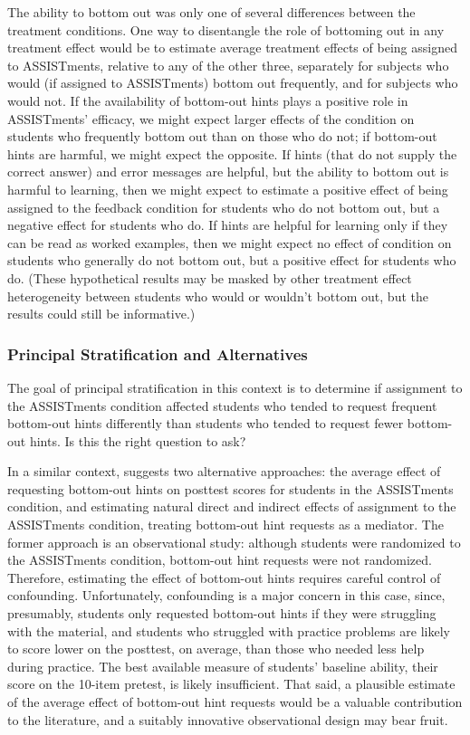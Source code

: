 \documentclass[]{article}
\begin{document}
The ability to bottom out was only one of several differences between the treatment conditions. One way to disentangle the role of bottoming out in any treatment effect would be to estimate average treatment effects of being assigned to ASSISTments, relative to any of the other three, separately for subjects who would (if assigned to ASSISTments) bottom out frequently, and for subjects who would not.
If the availability of bottom-out hints plays a positive role in ASSISTments' efficacy, we might expect larger effects of the condition on students who frequently bottom out than on those who do not; if bottom-out hints are harmful, we might expect the opposite.
If hints (that do not supply the correct answer) and error messages are helpful, but the ability to bottom out is harmful to learning, then we might expect to estimate a positive effect of being assigned to the feedback condition for students who do not bottom out, but a negative effect for students who do. If hints are helpful for learning only if they can be read as worked examples, then we might expect no effect of condition on students who generally do not bottom out, but a positive effect for students who do.
(These hypothetical results may be masked by other treatment effect heterogeneity between students who would or wouldn't bottom out, but the results could still be informative.)

\subsubsection{Principal Stratification and Alternatives}\label{sec:psInEdTech}
The goal of principal stratification in this context is to determine if assignment to the ASSISTments condition affected students who tended to request frequent bottom-out hints differently than students who tended to request fewer bottom-out hints.
Is this the right question to ask?

In a similar context, \citet{sales2021student} suggests two alternative approaches: the average effect of requesting bottom-out hints on posttest scores for students in the ASSISTments condition, and estimating natural direct and indirect effects of assignment to the ASSISTments condition, treating bottom-out hint requests as a mediator.
The former approach is an observational study: although students were randomized to the ASSISTments condition, bottom-out hint requests were not randomized. Therefore, estimating the effect of bottom-out hints requires careful control of confounding.
Unfortunately, confounding is a major concern in this case, since, presumably, students only requested bottom-out hints if they were struggling with the material, and students who struggled with practice problems are likely to score lower on the posttest, on average, than those who needed less help during practice.
The best available measure of students' baseline ability, their score on the 10-item pretest, is likely insufficient.
That said, a plausible estimate of the average effect of bottom-out hint requests would be a valuable contribution to the literature, and a suitably innovative observational design \citep[e.g.][]{beck} may bear fruit.
\end{document}
